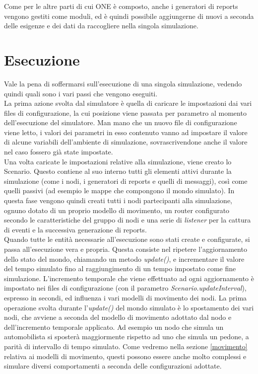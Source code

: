 Come per le altre parti di cui ONE è composto, anche i generatori di reports vengono gestiti come moduli, ed è quindi possibile aggiungerne di nuovi a seconda delle esigenze e dei dati da raccogliere nella singola simulazione.


\section{Esecuzione}
Vale la pena di soffermarsi sull'esecuzione di una singola simulazione, vedendo quindi quali sono i vari passi che vengono eseguiti.
\\

La prima azione svolta dal simulatore è quella di caricare le impostazioni dai vari files di configurazione, la cui posizione viene passata per parametro al momento dell'esecuzione del simulatore. Man mano che un nuovo file di configurazione viene letto, i valori dei parametri in esso contenuto vanno ad impostare il valore di alcune variabili dell'ambiente di simulazione, sovrascrivendone anche il valore nel caso fossero già state impostate.
\\

Una volta caricate le impostazioni relative alla simulazione, viene creato lo Scenario. Questo contiene al suo interno tutti gli elementi attivi durante la simulazione (come i nodi, i generatori di reports e quelli di messaggi), così come quelli passivi (ad esempio le mappe che compongono il mondo simulato). In questa fase vengono quindi creati tutti i nodi partecipanti alla simulazione, ognuno dotato di un proprio modello di movimento, un router configurato secondo le caratteristiche del gruppo di nodi e una serie di \textit{listener} per la cattura di eventi e la successiva generazione di reports.
\\

Quando tutte le entità necessarie all'esecuzione sono stati create e configurate, si passa all'esecuzione vera e propria.
Questa consiste nel ripetere l'aggiornamento dello stato del mondo, chiamando un metodo \textit{update()}, e incrementare il valore del tempo simulato fino al raggiungimento di un tempo impostato come fine simulazione. L'incremento temporale che viene effettuato ad ogni aggiornamento è impostato nei files di configurazione (con il parametro \textit{Scenario.updateInterval}), espresso in secondi, ed influenza i vari modelli di movimento dei nodi. La prima operazione svolta durante l'\textit{update()} del mondo simulato è lo spostamento dei vari nodi, che avviene a seconda del modello di movimento adottato dal nodo e dell'incremento temporale applicato. Ad esempio un nodo che simula un automobilista si sposterà maggiormente rispetto ad uno che simula un pedone, a parità di intervallo di tempo simulato. Come vedremo nella sezione \ref{movimento} relativa ai modelli di movimento, questi possono essere anche molto complessi e simulare diversi comportamenti a seconda delle configurazioni adottate.
\\

